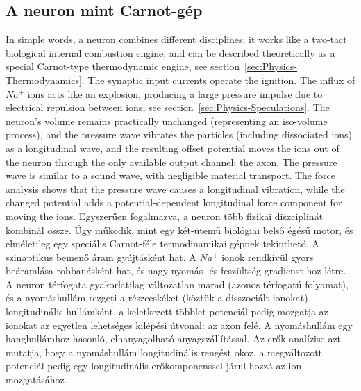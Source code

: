 \subsection[A neuron mint Carnot-gép]{A neuron mint Carnot-gép\label{sec:Model-CarnotEngine}}
\fi

\ifx\magyar\undefined  
In simple words, a neuron combines different disciplines; it works like a two-tact biological internal combustion engine, and can be described theoretically as a special Carnot-type thermodynamic engine, see section~\ref{sec:Physics-Thermodynamics}. The synaptic input currents operate the ignition. The influx of $Na^+$ ions acts like an explosion, producing a large pressure impulse due to electrical repulsion between ions; see section~\ref{sec:Physics-Speculations}. The neuron's volume remains practically unchanged (representing an iso-volume process), and the pressure wave vibrates the particles (including dissociated ions) as a longitudinal wave, and the resulting offset potential moves the ions out of the neuron through the only available output channel: the axon. The pressure wave is similar to a sound wave, with negligible material transport. 
The force analysis shows that the pressure wave
causes a longitudinal vibration, while the changed potential adds
a potential-dependent longitudinal force component for moving the ions.
\else
Egyszerűen fogalmazva, a neuron több fizikai diszciplinát kombinál össze.
Úgy működik, mint egy két-ütemű biológiai belső égésű motor,
és elméletileg egy speciális Carnot-féle termodinamikai gépnek
tekinthető.
A szinaptikus bemenő áram gyújtásként hat. A $Na^+$ ionok rendkívül gyors beáramlása robbanásként hat,
és nagy nyomás- és feszültség-gradienst hoz létre.
A neuron térfogata gyakorlatilag változatlan marad (azonos térfogatú folyamat),
és a nyomáshullám rezgeti a részecskéket (köztük a disszociált ionokat) longitudinális hullámként,
a keletkezett többlet potenciál pedig mozgatja az ionokat az egyetlen lehetséges  kilépési útvonal: az axon felé. 
A nyomáshullám egy hanghullámhoz hasonló, elhanyagolható anyagszállítással.
Az erők analízise azt mutatja, hogy a nyomáshullám longitudinális rengést okoz, a megváltozott potenciál pedig egy longitudinális 
erőkomponenssel járul hozzá az ion mozgatásához.
\fi


